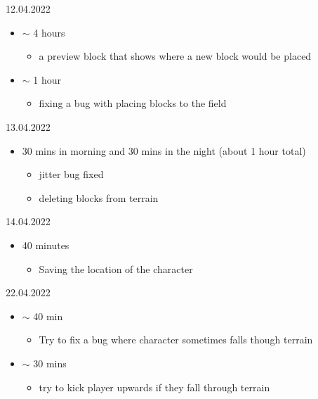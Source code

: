 \documentclass{article}
\begin{document}
12.04.2022
\begin{itemize}
	\item $\sim$ 4 hours
	\begin{itemize}
		\item a preview block that shows where a new block would be placed
	\end{itemize}
\item $\sim$ 1 hour
\begin{itemize}
	\item fixing a bug with placing blocks to the field
\end{itemize}
\end{itemize}

13.04.2022
\begin{itemize}
	\item 30 mins in morning and 30 mins in the night (about 1 hour total)
	\begin{itemize}
		\item jitter bug fixed
		\item deleting blocks from terrain
	\end{itemize}
\end{itemize}

14.04.2022
\begin{itemize}
	\item 40 minutes
	\begin{itemize}
		\item Saving the location of the character
	\end{itemize}
\end{itemize}

22.04.2022
\begin{itemize}
	\item $\sim$ 40 min
	\begin{itemize}
		\item Try to fix a bug where character sometimes falls though terrain
	\end{itemize}
\item $\sim$ 30 mins
\begin{itemize}
	\item try to kick player upwards if they fall through terrain
\end{itemize}
\end{itemize}
\end{document}

